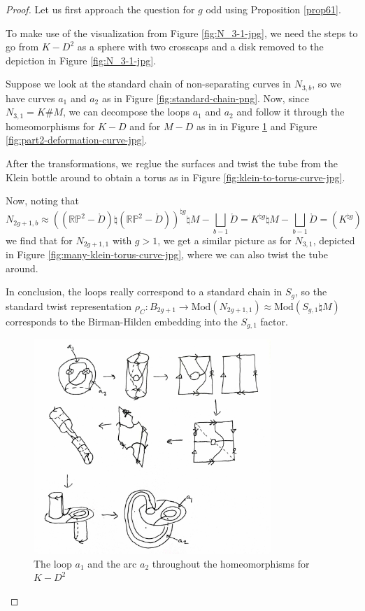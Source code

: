 \documentclass[reqno]{amsart}
\theoremstyle{definition}
\theoremstyle{remark}
\newcommand{\Mod}{{\mathrm{Mod}}}
\begin{document}
\begin{proof}
Let us first approach the question for
$g$ odd using Proposition \ref{prop61}.


To make use of the visualization from Figure
\ref{fig:N_3-1-jpg}, we need the steps to go from 
$K - D^2$ as a sphere with two crosscaps and a disk removed
to the depiction in Figure \ref{fig:N_3-1-jpg}.

Suppose we look at the standard chain of non-separating curves
in $N_{3,b}$, so we have curves $a_1$ and $a_2$ as
in Figure \ref{fig:standard-chain-png}.
Now, since
 $N_{3,1} = K \# M $, we can decompose the loops
 $a_1$ and $a_2$ and follow
 it through the homeomorphisms for
 $K - D$ and for $M - D$ as in 
 in Figure \ref{fig:part1-deformation-curve-jpg} and
 Figure \ref{fig:part2-deformation-curve-jpg}.

 After the transformations, we reglue the surfaces
 and twist
 the tube from the Klein bottle around
 to obtain a torus 
 as in Figure \ref{fig:klein-to-torus-curve-jpg}.

 Now, noting that 
 \[
 N_{2g+1,b}
 \approx 
 \left( \left( \mathbb{R}\mathbb{P}^2 - \mathring{D} \right)
\natural \left( \mathbb{R}\mathbb{P}^2 
- \mathring{D} \right)\right)^{\natural g}
\natural M - \bigsqcup_{b-1} \mathring{D} 
= K^{\natural g} \natural M - 
\bigsqcup_{b-1} \mathring{D}
= \left( K^{\natural g} \right) 
\]
we find that for $N_{2g+1,1}$ with $g>1$, we get a similar
picture as for $N_{3,1}$, depicted in Figure
\ref{fig:many-klein-torus-curve-jpg}, where
we can also twist the tube around.

In conclusion, the loops really correspond to a
standard chain in $S_g$, so the
standard twist representation
$\rho_{C} \colon
B_{2g+1} \to \Mod \left( N_{2g+1,1} \right) 
\approx \Mod \left( S_{g,1} \natural M \right) $ 
corresponds to the Birman-Hilden embedding
into the $S_{g,1}$ factor.



\begin{figure}[htpb]
    \centering
    \includegraphics[width=0.8\textwidth]{part1-deformation-curve.jpg}
    \caption{The loop
    $a_1$ and the arc $a_2$ throughout the homeomorphisms for
$K-D^2$}
    \label{fig:part1-deformation-curve-jpg}
\end{figure}


\end{proof}
\end{document}
